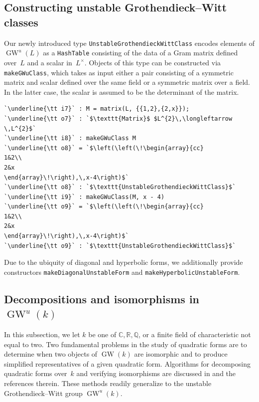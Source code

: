 \documentclass[12pt]{amsart}
\theoremstyle{definition}
\DeclareMathOperator{\GW}{GW}
\begin{document}
\subsection{Constructing unstable Grothendieck--Witt classes}\label{subsec: constructing GWu classes}
Our newly introduced type \texttt{UnstableGrothendieckWittClass} encodes elements of $\GW^{u}(L)$ as a \texttt{HashTable} consisting of the data of a Gram matrix defined over~$L$ and a scalar in~$L^{\times}$. Objects of this type can be constructed via \texttt{makeGWuClass}, which takes as input either a pair consisting of a symmetric matrix and scalar defined over the same field or a symmetric matrix over a field. In the latter case, the scalar is assumed to be the determinant of the matrix. 
\begin{lstlisting}[language=Macaulay2output]
`\underline{\tt i7}` : M = matrix(L, {{1,2},{2,x}});
`\underline{\tt o7}` : `$\texttt{Matrix}$ $L^{2}\,\longleftarrow \,L^{2}$`
`\underline{\tt i8}` : makeGWuClass M
`\underline{\tt o8}` = `$\left(\left(\!\begin{array}{cc}
1&2\\
2&x
\end{array}\!\right),\,x-4\right)$`
`\underline{\tt o8}` : `$\texttt{UnstableGrothendieckWittClass}$`
`\underline{\tt i9}` : makeGWuClass(M, x - 4)
`\underline{\tt o9}` = `$\left(\left(\!\begin{array}{cc}
1&2\\
2&x
\end{array}\!\right),\,x-4\right)$`
`\underline{\tt o9}` : `$\texttt{UnstableGrothendieckWittClass}$`
\end{lstlisting}
Due to the ubiquity of diagonal and hyperbolic forms, we additionally provide constructors \texttt{makeDiagonalUnstableForm} and \texttt{makeHyperbolicUnstableForm}. 

\subsection{Decompositions and isomorphisms in \texorpdfstring{$\GW^{u}(k)$}{GW\^{}u(k)}}\label{subsec: decompositions and isomorphisms}
In this subsection, we let $k$ be one of $\mathbb{C},\mathbb{R},\mathbb{Q}$, or a finite field of characteristic not equal to two. Two fundamental problems in the study of quadratic forms are to determine when two objects of $\GW(k)$ are isomorphic and to produce simplified representatives of a given quadratic form. Algorithms for decomposing quadratic forms over~$k$ and verifying isomorphisms are discussed in \cite[\S~2.1-2]{A1BrouwerDegreesArticle} and the references therein. These methods readily generalize to the unstable Grothendieck--Witt group $\GW^{u}(k)$.
\end{document}
